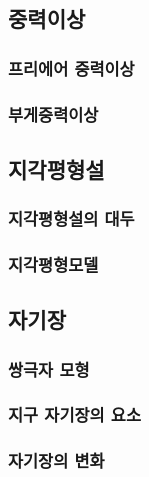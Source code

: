 \subsection{중력이상}\index{}
\subsubsection{프리에어 중력이상}\index{}
\subsubsection{부게중력이상}\index{}
\subsection{지각평형설}\index{}
\subsubsection{지각평형설의 대두}\index{}
\subsubsection{지각평형모델}\index{}

\subsection{자기장}\index{}
\subsubsection{쌍극자 모형}\index{}
\subsubsection{지구 자기장의 요소}\index{}
\subsubsection{자기장의 변화}\index{}